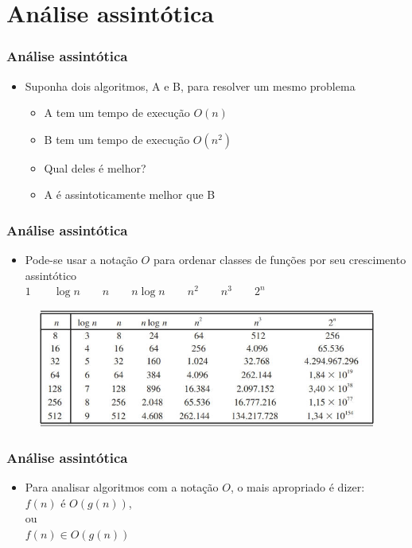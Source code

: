 \documentclass[aspectratio=169]{beamer}
\begin{document}
\section{Análise assintótica}

\begin{frame}\frametitle{Análise assintótica}
\begin{itemize}
	\item Suponha dois algoritmos, A e B, para resolver um mesmo problema
	\begin{itemize}
		\item A tem um tempo de execução $O(n)$
		\item B tem um tempo de execução $O(n^2)$
		\item Qual deles é melhor?
		\item A é assintoticamente melhor que B
	\end{itemize}
\end{itemize}
\end{frame}

\begin{frame}\frametitle{Análise assintótica}
\begin{itemize}
	\item Pode-se usar a notação $O$ para ordenar classes de funções por seu crescimento assintótico\\
$1$ ~ ~ $\log{n}$ ~ ~ $n$ ~ ~ $n\log{n}$ ~ ~ $n^2$ ~ ~ $n^3$ ~ ~ $2^n$
\end{itemize}
\begin{figure}[h]
	\centering
	\includegraphics[height=0.5\paperheight]{imagens/tabela.jpg}
\end{figure}
\end{frame}

\begin{frame}\frametitle{Análise assintótica}
\begin{itemize}
	\item Para analisar algoritmos com a notação $O$, o mais apropriado é dizer:\\
$f(n)$ é $O(g(n))$,\\
ou\\
$f(n) \in O(g(n))$
\end{itemize}
\end{frame}
\end{document}
